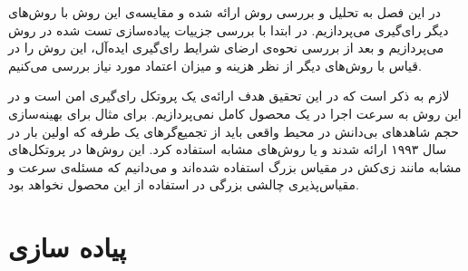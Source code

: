 در این فصل به تحلیل و بررسی روش ارائه شده و مقایسه‌ی این روش با روش‌های دیگر رای‌گیری می‌پردازیم. در ابتدا با بررسی جزییات پیاده‌سازی تست شده در روش می‌پردازیم و بعد از بررسی نحوه‌ی ارضای شرایط رای‌گیری ایده‌آل، این روش را در قیاس با روش‌های دیگر از نظر هزینه و میزان اعتماد مورد نیاز بررسی می‌کنیم. 
\par
لازم به ذکر است که در این تحقیق هدف ارائه‌ی یک پروتکل رای‌گیری امن است و در این روش به سرعت اجرا در یک محصول کامل نمی‌پردازیم. برای مثال برای بهینه‌سازی حجم شاهد‌های بی‌دانش در محیط واقعی باید از تجمیع‌گر‌های یک طرفه 
که اولین بار در سال ۱۹۹۳ 
\cite{oneway}
ارائه شدند و یا روش‌های مشابه استفاده کرد. این روش‌ها در پروتکل‌های مشابه مانند زی‌کش در مقیاس بزرگ استفاده‌ شده‌اند و می‌دانیم که مسئله‌ی سرعت و مقیاس‌پذیری چالشی بزرگی در استفاده از این محصول نخواهد بود.

\section{پیاده سازی}

